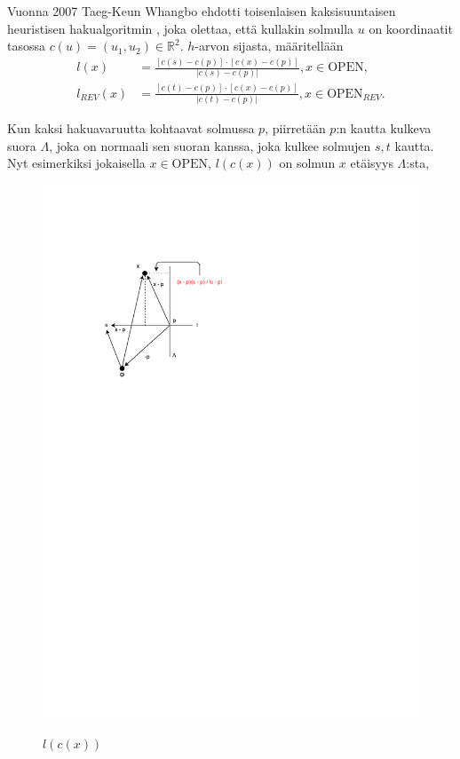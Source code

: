 \documentclass[finnish]{tktltiki2}
\theoremstyle{definition}
\theoremstyle{remark}
\begin{document}
Vuonna 2007 Taeg-Keun Whangbo ehdotti toisenlaisen kaksisuuntaisen heuristisen hakualgoritmin \cite{Whangbo07}, joka olettaa, että kullakin solmulla $u$ on koordinaatit tasossa $c(u) = (u_1, u_2) \in \mathbb{R}^2$. $h$-arvon sijasta, määritellään
\begin{align*}
l(x) &= \frac{[c(s) - c(p)] \cdot [c(x) - c(p)]}{ | c(s) - c(p) | }, x \in \text{OPEN}, \\
l_{REV}(x) &= \frac{[c(t) - c(p)] \cdot [c(x) - c(p)]}{ | c(t) - c(p) | }, x \in \text{OPEN}_{REV}.
\end{align*}

Kun kaksi hakuavaruutta kohtaavat solmussa $p$, piirretään $p$:n kautta kulkeva suora $\Lambda$, joka on normaali sen suoran kanssa, joka kulkee solmujen $s, t$ kautta. Nyt esimerkiksi jokaisella $x \in \text{OPEN}$, $l(c(x))$ on solmun $x$ etäisyys $\Lambda$:sta,
\begin{figure}
  \centering
  \includegraphics[trim=-1cm 15cm 0cm 4cm,width=550px,keepaspectratio]{Whangbo.pdf}
  \label{fig:whangbo}
  \caption{$l(c(x))$}
\end{figure}
\end{document}
